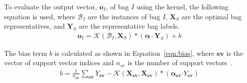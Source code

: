 \documentclass[reqno]{vcuthesis}
\newcommand{\spa}[1]{\mathcal{#1}}
\numberwithin{equation}{chapter}
\begin{document}
To evaluate the output vector, $\bm o_I$, of bag $I$ using the kernel, the following equation is used, where $\mathcal{B}_I$ are the instances of bag $I$, $\bm X_S$ are the optimal bag representatives, and $\bm Y_S$ are the representative bag labels.
\begin{align}
\bm o_I = \spa{K}(\mathcal{B}_I,\bm X_S)*(\bm\alpha \cdot \bm Y_S) + b
\end{align}

\newpage

The bias term $b$ is calculated as shown in Equation~\eqref{eqn:bias}, where $\bm{sv}$ is the vector of support vector indices and $n_{sv}$ is the number of support vectors~\cite{Huang2006}.
\begin{align}
\label{eqn:bias}
b = \frac{1}{n_{\bm{sv}}}\sum_{\bm{sv}} Y_{\bm{sv}} - \spa{K}(\bm X_{\bm{sv}},\bm X_{\bm{sv}})*(\bm \alpha_{\bm{sv}}\bm\cdot Y_{\bm{sv}})
\end{align}
\end{document}

